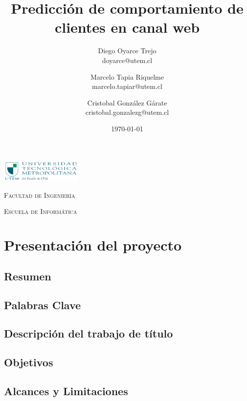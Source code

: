 \documentclass{report}
\title{\Huge Predicción de comportamiento de clientes en canal web}
\author{Diego Oyarce Trejo \\ doyarce@utem.cl \and
        Marcelo Tapia Riquelme \\ marcelo.tapiar@utem.cl \and
        Cristobal González Gárate \\ cristobal.gonzalezg@utem.cl
        }
\date{\today}
\begin{document}
\begin{titlepage}
  \centering  
  \includegraphics[width=0.3\textwidth]{img/logoutem.png}  
  \vspace{1cm}
  
  \textsc{\LARGE Facultad de Ingeniería}  
  \vspace{0.5cm}
  
  \textsc{\LARGE Escuela de Informática}
  {\let\newpage\relax\maketitle}
\end{titlepage}

\tableofcontents

\listoffigures

\setcounter{section}{1}

\chapter{Presentación del proyecto}
\newpage

\section{Resumen}


\section{Palabras Clave}


\section{Descripción del trabajo de título}


\section{Objetivos}


\section{Alcances y Limitaciones}

\end{document}
